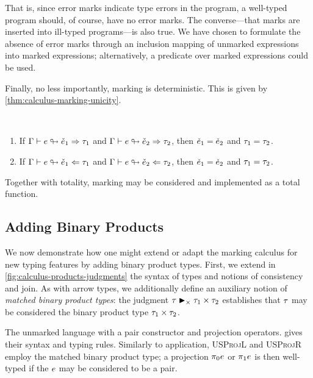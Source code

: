 %
That is, since error marks indicate type errors in the program, a well-typed program should, of
course, have no error marks. The converse---that marks are inserted into ill-typed programs---is
also true. We have chosen to formulate the absence of error marks through an inclusion mapping of
unmarked expressions into marked expressions; alternatively, a predicate over marked expressions
could be used. %

Finally, no less importantly, marking is deterministic. This is given by
\cref{thm:calculus-marking-unicity}.
%
\begin{theorem}[name=Marking Unicity] \
  \label{thm:calculus-marking-unicity}
  \begin{enumerate}
    \item If $\Gamma \vdash e \looparrowright \check{e}_1 \Rightarrow \tau_1$ and
      $\Gamma \vdash e \looparrowright \check{e}_2 \Rightarrow \tau_2$, then $\check{e}_1 = \check{e}_2$ and $\tau_1 =
      \tau_2$.
    \item If $\Gamma \vdash e \looparrowright \check{e}_1 \Leftarrow \tau_1$ and
      $\Gamma \vdash e \looparrowright \check{e}_2 \Leftarrow \tau_2$, then $\check{e}_1 = \check{e}_2$ and $\tau_1 =
      \tau_2$.
  \end{enumerate}
\end{theorem}
%
Together with totality, marking may be considered and implemented as a total function.

\subsection{Adding Binary Products}
\label{sec:calculus-products}

We now demonstrate how one might extend or adapt the marking calculus for new typing features by
adding binary product types. First, we extend in \cref{fig:calculus-products-judgments} the syntax
of types and notions of consistency and join. As with arrow types, we additionally define an
auxiliary notion of \emph{matched binary product types}: the judgment
$\tau \blacktriangleright_{\times} \tau_1 \times \tau_2$ establishes that $\tau$ may be considered the binary product
type $\tau_1 \times \tau_2$.



The unmarked language with a pair constructor and projection operators.
\Cref{fig:calculus-products-uexp} gives their syntax and typing rules. Similarly to application,
\textsc{USProjL} and \textsc{USProjR} employ the matched binary product type; a projection
$\pi_0 e$ or $\pi_1 e$ is then well-typed if the $e$ may be considered to be a pair.

